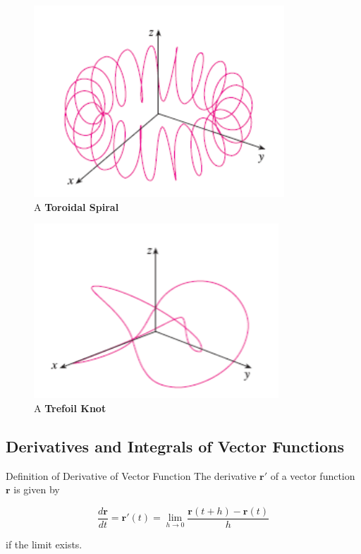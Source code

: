         \begin{figure}[hbt!]
            \centering
            \caption*{A \textbf{Toroidal Spiral}}
            \includegraphics[scale = 0.6]{Resources/13.1_Toroidal_Spiral}
        \end{figure}

        \begin{figure}[hbt!]
            \centering
            \caption*{A \textbf{Trefoil Knot}}
            \includegraphics[scale = 0.6]{Resources/13.1_Trefoil_Knot}
        \end{figure}

    \subsection{Derivatives and Integrals of Vector Functions}      %

        \begin{theorem}{Definition of Derivative of Vector Function}
            The derivative $\mathbf{r'}$ of a vector function $\mathbf{r}$ is given by

            \[
                \frac{d\mathbf{r}}{dt} = \mathbf{r}'(t) = \lim_{h\to 0} \frac{\mathbf{r}(t+h) - \mathbf{r}(t)}{h}
            \]

            if the limit exists.
        \end{theorem}

